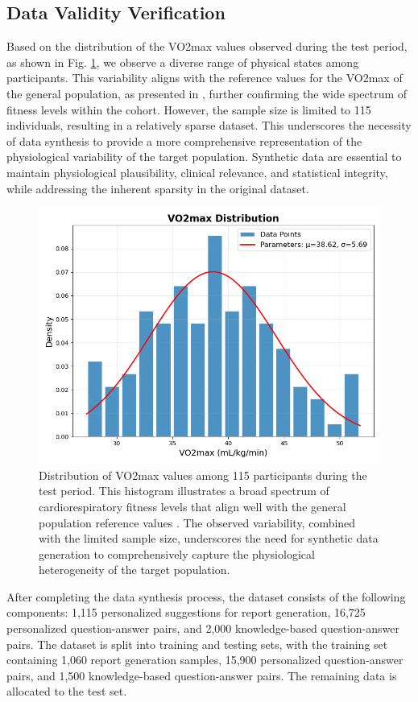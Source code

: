 \documentclass[preprint,12pt]{elsarticle}
\begin{document}
\subsection{Data Validity Verification}
Based on the distribution of the VO2max values observed during the test period, as shown in Fig. \ref{fig9}, we observe a diverse range of physical states among participants. This variability aligns with the reference values for the VO2max of the general population, as presented in \cite{kaminsky2015reference}, further confirming the wide spectrum of fitness levels within the cohort. However, the sample size is limited to 115 individuals, resulting in a relatively sparse dataset. This underscores the necessity of data synthesis to provide a more comprehensive representation of the physiological variability of the target population. Synthetic data are essential to maintain physiological plausibility, clinical relevance, and statistical integrity, while addressing the inherent sparsity in the original dataset.
\begin{figure}[ht]
\centering
\includegraphics[width=\columnwidth]{hist.png}
\caption{Distribution of VO2max values among 115 participants during the test period. This histogram illustrates a broad spectrum of cardiorespiratory fitness levels that align well with the general population reference values \cite{kaminsky2015reference}. The observed variability, combined with the limited sample size, underscores the need for synthetic data generation to comprehensively capture the physiological heterogeneity of the target population.}
\label{fig9}
\end{figure}
After completing the data synthesis process, the dataset consists of the following components: 1,115 personalized suggestions for report generation, 16,725 personalized question-answer pairs, and 2,000 knowledge-based question-answer pairs. The dataset is split into training and testing sets, with the training set containing 1,060 report generation samples, 15,900 personalized question-answer pairs, and 1,500 knowledge-based question-answer pairs. The remaining data is allocated to the test set.
\end{document}

